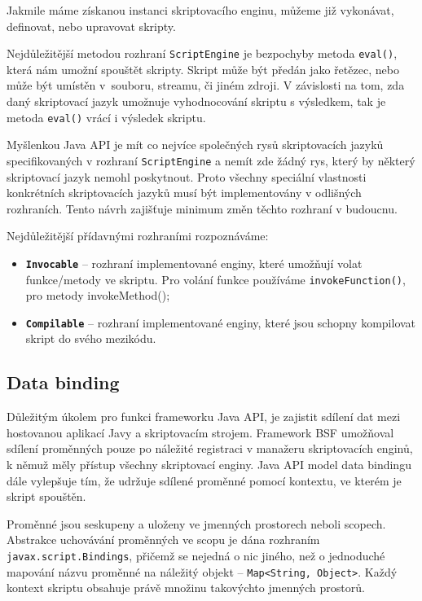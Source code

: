 Jakmile máme získanou instanci skriptovacího enginu, můžeme již vykonávat, definovat, nebo upravovat skripty.

Nejdůležitější metodou rozhraní \texttt{ScriptEngine} je bezpochyby metoda \texttt{eval()}, která nám umožní spouštět skripty. Skript může být předán jako řetězec, nebo může být umístěn v~souboru, streamu, či jiném zdroji. V závislosti na tom, zda daný skriptovací jazyk umožnuje vyhodnocování skriptu s výsledkem, tak je metoda \texttt{eval()} vrácí i výsledek skriptu.

Myšlenkou Java API je mít co nejvíce společných rysů skriptovacích jazyků specifikovaných v rozhraní \texttt{ScriptEngine} a nemít zde žádný rys, který by některý skriptovací jazyk nemohl poskytnout. Proto všechny speciální vlastnosti konkrétních skriptovacích jazyků musí být implementovány v odlišných rozhraních. Tento návrh zajišťuje minimum změn těchto rozhraní v budoucnu. 

\bigskip \noindent Nejdůležitější přídavnými rozhraními rozpoznáváme:

\begin{itemize}
  \item \textbf{\texttt{Invocable}} -- rozhraní implementované enginy, které umožňují volat funkce/metody ve skriptu. Pro volání funkce používáme \texttt{invokeFunction()}, pro metody invokeMethod();
  \item \textbf{\texttt{Compilable}} -- rozhraní implementované enginy, které jsou schopny kompilovat skript do svého mezikódu.
\end{itemize}

\subsection{Data binding}
\label{Chapter.JavaScriptInJavaAnalysis.ScriptingJavaAPI.DataBinding}

Důležitým úkolem pro funkci frameworku Java API, je zajistit sdílení dat mezi hostovanou aplikací Javy a skriptovacím strojem. Framework BSF umožňoval sdílení proměnných pouze po náležité registraci v manažeru skriptovacích enginů, k němuž měly přístup všechny skriptovací enginy. Java API model data bindingu dále vylepšuje tím, že udržuje sdílené proměnné pomocí kontextu, ve kterém je skript spouštěn.

Proměnné jsou seskupeny a uloženy ve jmenných prostorech neboli scopech. Abstrakce uchovávání proměnných ve scopu je dána rozhraním \texttt{javax.script.Bindings}, přičemž se nejedná o nic jiného, než o jednoduché mapování názvu proměnné na náležitý objekt -- \texttt{Map<String, Object>}. Každý kontext skriptu obsahuje právě množinu takovýchto jmenných prostorů.

